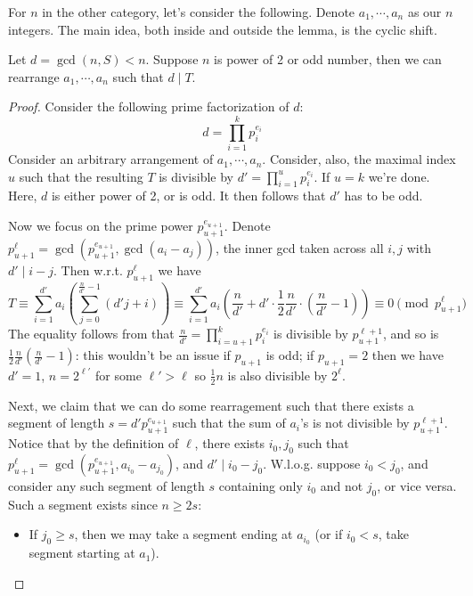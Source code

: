 \documentclass[11pt,a4paper]{article}
\begin{document}
\begin{enumerate}
        For $n$ in the other category, let's consider the following. 
        Denote $a_1, \cdots, a_n$ as our $n$ integers. The main idea, both inside and outside the lemma, is the cyclic shift. 
        \begin{lemma}
        	\label{lemma:n6}
        	Let $d = \gcd(n, S) < n$. 
        	Suppose $n$ is power of 2 or odd number, then we can rearrange $a_1, \cdots, a_n$ such that 
        	$d \mid T$. 
        \end{lemma}
        \begin{proof}
        	Consider the following prime factorization of $d$: 
        	\[
        	d = \prod_{i=1}^k p_i^{e_i}
        	\]
        	Consider an arbitrary arrangement of $a_1, \cdots, a_n$. 
        	Consider, also, the maximal index $u$ such that the resulting $T$ is divisible by $d'=\prod_{i=1}^u p_i^{e_i}$. 
        	If $u=k$ we're done. 
        	Here, $d$ is either power of 2, or is odd. It then follows that $d'$ has to be odd. 
        	
        	Now we focus on the prime power $p_{u+1}^{e_{u+1}}$. 
        	Denote $p_{u+1}^{\ell} = \gcd(p_{u+1}^{e_{u+1}}, \gcd(a_i - a_j))$, 
        	the inner gcd taken across all $i, j$ with $d'\mid i - j$. 
        	Then w.r.t. $p_{u+1}^{\ell}$ we have 
        	\[
        	T \equiv \sum_{i=1}^{d'} a_i\left(\sum_{j=0}^{\frac{n}{d'}-1}(d'j + i)\right)
        	\equiv \sum_{i=1}^{d'} a_i\left(\frac{n}{d'} + d'\cdot \frac 12 \frac{n}{d'}\cdot \left(\frac{n}{d'} - 1\right)\right)
        	\equiv 0\pmod{p_{u+1}^{\ell}}
        	\]
        	The equality follows from that $\frac{n}{d'}=\prod_{i=u+1}^k p_i^{e_i}$ is divisible by $p_{u+1}^{\ell+1}$, 
        	and so is $\frac 12\frac{n}{d'}\left(\frac{n}{d'} - 1\right)$: this wouldn't be an issue if $p_{u+1}$ is odd; 
        	if $p_{u+1}=2$ then we have $d'=1$, $n = 2^{\ell'}$ for some $\ell'>\ell$ so $\frac 12 n$ is also divisible by $2^{\ell}$. 
        	
        	Next, we claim that we can do some rearragement such that there exists a segment of length $s = d'p_{u+1}^{e_{u+1}}$ such that the sum of $a_i$'s is not divisible by $p_{u+1}^{\ell+1}$. 
        	Notice that by the definition of $\ell$, there exists $i_0, j_0$ such that $p_{u+1}^{\ell} = \gcd(p_{u+1}^{e_{u+1}}, a_{i_0}-a_{j_0})$, and $d'\mid i_0 - j_0$. 
        	W.l.o.g. suppose $i_0 < j_0$, 
        	and consider any such segment of length $s$ containing only $i_0$ and not $j_0$, or vice versa.  
        	Such a segment exists since $n\ge 2s$: 
        	\begin{itemize}
        		\item If $j_0\ge s$, then we may take a segment ending at $a_{i_0}$ (or if $i_0 < s$, take segment starting at $a_1$). 
        		

\end{itemize}
\end{proof}
\end{enumerate}
\end{document}
